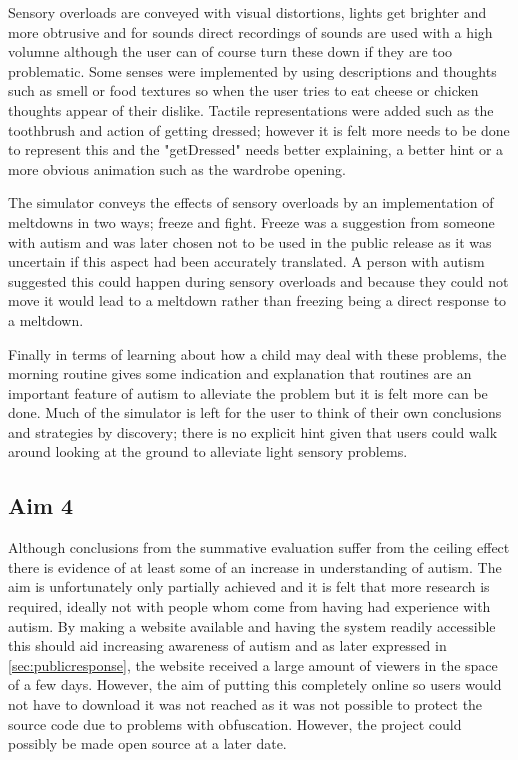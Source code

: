 \documentclass[11pt]{report}
\begin{document}
Sensory overloads are conveyed with visual distortions, lights get brighter and more obtrusive and for sounds direct recordings of sounds are used with a high volumne although the user can of course turn these down if they are too problematic. Some senses were implemented by using descriptions and thoughts such as smell or food textures so when the user tries to eat cheese or chicken thoughts appear of their dislike. Tactile representations were added such as the toothbrush and action of getting dressed; however it is felt more needs to be done to represent this and the "getDressed" needs better explaining, a better hint or a more obvious animation such as the wardrobe opening.

The simulator conveys the effects of sensory overloads by an implementation of meltdowns in two ways; freeze and fight. Freeze was a suggestion from someone with autism and was later chosen not to be used in the public release as it was uncertain if this aspect had been accurately translated. A person with autism suggested this could happen during sensory overloads and because they could not move it would lead to a meltdown rather than freezing being a direct response to a meltdown. 

Finally in terms of learning about how a child may deal with these problems, the morning routine gives some indication and explanation that routines are an important feature of autism to alleviate the problem but it is felt more can be done. Much of the simulator is left for the user to think of their own conclusions and strategies by discovery; there is no explicit hint given that users could walk around looking at the ground to alleviate light sensory problems.


\subsection*{Aim 4}
Although conclusions from the summative evaluation suffer from the ceiling effect there is evidence of at least some of an increase in understanding of autism. The aim is unfortunately only partially achieved and it is felt that more research is required, ideally not with people whom come from having had experience with autism. By making a website available and having the system readily accessible this should aid increasing awareness of autism and as later expressed in \ref{sec:publicresponse}, the website received a large amount of viewers in the space of a few days. However, the aim of putting this completely online so users would not have to download it was not reached as it was not possible to protect the source code due to problems with obfuscation. However, the project could possibly be made open source at a later date.
\end{document}
